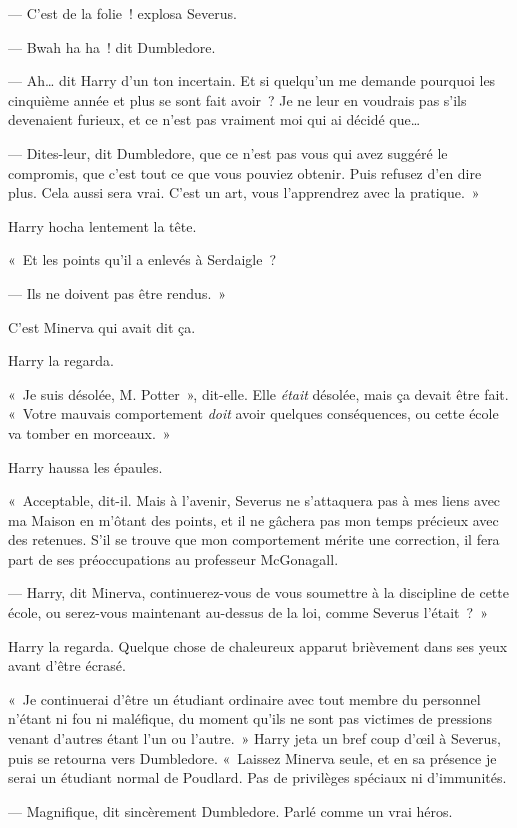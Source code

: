 --- C'est de la folie~! explosa Severus.

--- Bwah ha ha~! dit Dumbledore.

--- Ah… dit Harry d'un ton incertain. Et si quelqu'un me demande pourquoi les cinquième année et plus se sont fait avoir~? Je ne leur en voudrais pas s'ils devenaient furieux, et ce n'est pas vraiment moi qui ai décidé que…

--- Dites-leur, dit Dumbledore, que ce n'est pas vous qui avez suggéré le compromis, que c'est tout ce que vous pouviez obtenir. Puis refusez d'en dire plus. Cela aussi sera vrai. C'est un art, vous l'apprendrez avec la pratique.~»

Harry hocha lentement la tête.

«~Et les points qu'il a enlevés à Serdaigle~?

--- Ils ne doivent pas être rendus.~»

C'est Minerva qui avait dit ça.

Harry la regarda.

«~Je suis désolée, M. Potter~», dit-elle. Elle \emph{était} désolée, mais ça devait être fait. «~Votre mauvais comportement \emph{doit} avoir quelques conséquences, ou cette école va tomber en morceaux.~»

Harry haussa les épaules.

«~Acceptable, dit-il. Mais à l'avenir, Severus ne s'attaquera pas à mes liens avec ma Maison en m'ôtant des points, et il ne gâchera pas mon temps précieux avec des retenues. S'il se trouve que mon comportement mérite une correction, il fera part de ses préoccupations au professeur McGonagall.

--- Harry, dit Minerva, continuerez-vous de vous soumettre à la discipline de cette école, ou serez-vous maintenant au-dessus de la loi, comme Severus l'était~?~»

Harry la regarda. Quelque chose de chaleureux apparut brièvement dans ses yeux avant d'être écrasé.

«~Je continuerai d'être un étudiant ordinaire avec tout membre du personnel n'étant ni fou ni maléfique, du moment qu'ils ne sont pas victimes de pressions venant d'autres étant l'un ou l'autre.~» Harry jeta un bref coup d'œil à Severus, puis se retourna vers Dumbledore. «~Laissez Minerva seule, et en sa présence je serai un étudiant normal de Poudlard. Pas de privilèges spéciaux ni d'immunités.

--- Magnifique, dit sincèrement Dumbledore. Parlé comme un vrai héros.

